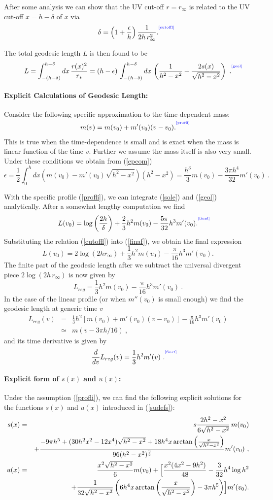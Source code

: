 \documentclass[12pt]{article}
\newcommand{\be}{\begin{equation}}
\newcommand{\ee}{\end{equation}}
\def\req#1{(\ref{#1})}
\def\s{\sigma}
\def\f#1#2{{\frac{#1}{#2}}}
\def\f#1#2{{\frac{#1}{#2}}}
\def\Label#1{\label{#1}%
{ \color{blue}{\smash{\hbox to0pt{\raise2ex\hbox{\tiny[#1]}\hss}}}}}
\def\s{\sqrt}
\def\f {\frac}
\def\no{\nonumber \\}
\def\ep{\epsilon}
\def\ba{\begin{eqnarray}}
\def\ea{\end{eqnarray}}
\begin{document}
After some analysis we can show that the UV cut-off $r=r_{\infty}$
is related to the UV cut-off $x=h-\delta$ of $x$ via
%
\be
\delta=\left(1+\f{\ep}{h}\right)\f{1}{2h\,r_{\infty}^2}.
\Label{cutoffl} \ee
%

The total geodesic length $L$ is then found to be
\be
L=\int^{h-\delta}_{-(h-\delta)} dx \, \f{r(x)^2}{r_*}
=(h-\ep)\,\int^{h-\delta}_{-(h-\delta)}dx\,
\left(\f{1}{h^2-x^2}+\f{2s(x)}{\s{h^2-x^2}}\right)\ . \Label{geol} \ee

\paragraph{Explicit Calculations of Geodesic Length:} Consider the following
specific approximation to the time-dependent mass:
%
\be m(v)=m(v_0)+m'(v_0)(v-v_0).  \Label{profli} \ee
%
This is true when the time-dependence is small and  is exact
when the mass is linear function of the time $v$. Further  we assume
the mass itself is also very small. Under these conditions we obtain
from \req{epcom}
%
\be \ep=\f{1}{2}\int^h_0 dx
(m(v_0)-m'(v_0)\s{h^2-x^2})(h^2-x^2)=\f{h^3}{3}m(v_0)-\f{3\pi
h^4}{32}m'(v_0) \ . \ee
%

With the specific profile \req{profli}, we can integrate \req{sole}
and \req{geol} analytically. After a somewhat lengthy computation we
find
%
\be  L(v_0) = \log
\left(\f{2h}{\delta}\right)+\f{2}{3}h^2m(v_0)-\f{5\pi}{32}h^3
m'(v_0). \Label{finaf} \ee
%
Substituting the relation \req{cutoffl} into
\req{finaf}, we obtain the final expression
%
\be L(v_0)=2\log
(2hr_{\infty})+\f{1}{3}h^2m(v_0)-\f{\pi}{16}h^3 m'(v_0).  \ee
%
The finite part of the geodesic length after we subtract the
universal divergent piece $2\log (2h\, r_{\infty})$ is now given by
%
\be
L_{reg}=\f{1}{3}h^2m(v_0)-\f{\pi}{16}h^3 m'(v_0)  \ . \ee
%
 In the case of the linear profile (or when $m''(v_0)$ is small enough) we find
the geodesic length at generic time $v$
%
\ba
L_{reg}(v)&=&\f{1}{3}h^2[m(v_0)+m'(v_0)(v-v_0)]-\f{\pi}{16}h^3
m'(v_0) \no &\simeq& m(v-3\pi h/16)\ ,  \ea
%
 and its time derivative is given by
 \be \f{d}{dv}L_{reg}(v)=\f{1}{3}h^2 m'(v) \ . \Label{finrt}
\ee
%

\paragraph{Explicit form of $s(x)$ and $u(x)$:}
Under the assumption \req{profli}, we can find the following
explicit solutions for the functions $s(x)$ and $u(x)$ introduced in \req{sudefs}:
%
\ba  s(x) & =& s \f{2h^2-x^2}{6\s{h^2-x^2}}\,  m(v_0)\no && +
\f{-9\pi h^5+(30h^2x^2-12x^4)\s{h^2-x^2}+18h^4x \arctan
\left(\f{x}{\s{h^2-x^2}}\right)}{96(h^2-x^2)^\f{3}{2}}m'(v_0)\ ,\no
u(x)&=&\f{x^2\s{h^2-x^2}}{6}m(v_0)+\Bigl[\f{x^2(4x^2-9h^2)}{48}
-\f{3}{32}h^4\log h^2 \no &&
+\f{1}{32\s{h^2-x^2}}\left(6h^4x\arctan\left(\f{x}{\s{h^2-x^2}}\right)
-3\pi h^5\right)\Bigr]m'(v_0). \ea
\end{document}
